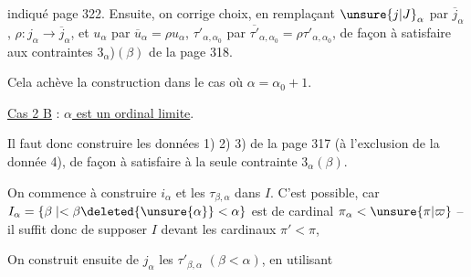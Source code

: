 
indiqué page 322. Ensuite, on corrige  choix, en remplaçant $\unsure{j|J}_\alpha$ par $\overline{j}_\alpha$,   $\rho:j_\alpha\to\overline{j}_\alpha$, et $u_\alpha$ par $\overline{u}_\alpha=\rho u_\alpha$, $\tau'_{\alpha,\alpha_0}$ par $\overline{\tau'}_{\alpha,\alpha_0}=\rho\tau'_{\alpha,\alpha_0}$, de façon à satisfaire aux contraintes \unsure{(}$3_\alpha$)$(\beta)$ de la page 318.

Cela achève la construction dans le cas où $\alpha=\alpha_0+1$. 

\uline{Cas 2 B} : \uline{$\alpha$ est un ordinal limite}.

Il faut donc construire les données 1) 2) 3) de la page 317 (à l'exclusion de la donnée 4), de façon à satisfaire à la seule contrainte $3_\alpha(\beta)$.

On commence à construire $i_\alpha$ et les $\tau_{\beta,\alpha}$ dans $I$. C'est possible, car $I_\alpha=\{\beta\mid<\beta\deleted{\unsure{\alpha}}<\alpha\}$ est de cardinal \deleted{$\unsure{\pi_\alpha}$} $\pi_\alpha<\unsure{\pi|\varpi}$ -- il suffit donc de supposer $I$  devant les cardinaux  $\pi'<\pi$,

On construit ensuite de \unsure{$=$} $j_\alpha$   les $\tau'_{\beta,\alpha}$ $(\beta<\alpha)$, en utilisant 
